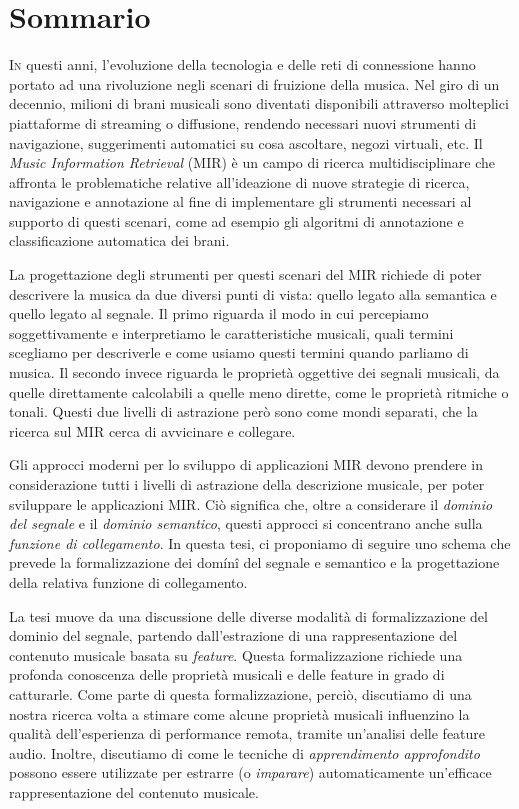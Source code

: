 \chapter*{Sommario}
\lettrine{I}{n} questi anni, l'evoluzione della tecnologia e delle reti di connessione hanno portato ad una rivoluzione negli scenari di fruizione della musica. Nel giro di un decennio, milioni di brani musicali sono diventati disponibili attraverso molteplici piattaforme di streaming o diffusione, rendendo necessari nuovi strumenti di navigazione, suggerimenti automatici su cosa ascoltare, negozi virtuali, etc. Il \textit{Music Information Retrieval} (MIR) \`e un campo di ricerca multidisciplinare che affronta le problematiche relative all'ideazione di nuove strategie di ricerca, navigazione e annotazione al fine di implementare gli strumenti necessari al supporto di questi scenari, come ad esempio gli algoritmi di annotazione e classificazione automatica dei brani.

La progettazione degli strumenti per questi scenari del MIR richiede di poter descrivere la musica da due diversi punti di vista: quello legato alla semantica e quello legato al segnale. Il primo riguarda il modo in cui percepiamo soggettivamente e interpretiamo le caratteristiche musicali, quali termini scegliamo per descriverle e come usiamo questi termini quando parliamo di musica. Il secondo invece riguarda le propriet\`a oggettive dei segnali musicali, da quelle direttamente calcolabili a quelle meno dirette, come le propriet\`a ritmiche o tonali. Questi due livelli di astrazione per\`o sono come mondi separati, che la ricerca sul MIR cerca di avvicinare e collegare.

Gli approcci moderni per lo sviluppo di applicazioni MIR devono prendere in considerazione tutti i livelli di astrazione della descrizione musicale, per poter sviluppare le applicazioni MIR. Ci\`o significa che, oltre a considerare il \textit{dominio del segnale} e il \textit{dominio semantico}, questi approcci si concentrano anche sulla \textit{funzione di collegamento}. In questa tesi, ci proponiamo di seguire uno schema che prevede la formalizzazione dei dom\'in\^i del segnale e semantico e la progettazione della relativa funzione di collegamento.

La tesi muove da una discussione delle diverse modalit\`a di formalizzazione del dominio del segnale, partendo dall'estrazione di una rappresentazione del contenuto musicale basata su \textit{feature}. Questa formalizzazione richiede una profonda conoscenza delle propriet\`a musicali e delle feature in grado di catturarle. Come parte di questa formalizzazione, perci\`o, discutiamo di una nostra ricerca volta a stimare come alcune propriet\`a musicali influenzino la qualit\`a dell'esperienza di performance remota, tramite un'analisi delle feature audio. Inoltre, discutiamo di come le tecniche di \textit{apprendimento approfondito} possono essere utilizzate per estrarre (o \textit{imparare}) automaticamente un'efficace rappresentazione del contenuto musicale.


